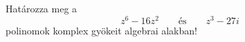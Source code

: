 \documentclass[11pt]{scrartcl}
\begin{document}
Határozza meg a
\[
	z^6 - 16z^2 \qquad \text{és} \qquad z^3 - 27i
\]
polinomok komplex gyökeit algebrai alakban!
\end{document}
